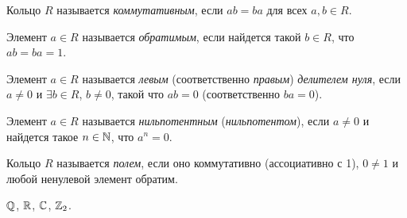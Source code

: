 \begin{definition}
    Кольцо $R$ называется \textit{коммутативным}, если $ab = ba$ для всех $a, b \in R$.
\end{definition}

\begin{definition}
    Элемент $a \in R$ называется \textit{обратимым}, если найдется такой $b \in R$, что $ab = ba = 1$.
\end{definition}

\begin{comment}
    Все обратимые элементы кольца $R$ образуют группу по умножению.
\end{comment}

\begin{definition}
    Элемент $a \in R$ называется \textit{левым} (соответственно \textit{правым}) \textit{делителем нуля}, если $a \neq 0$ и $\exists b \in R$, $b \neq 0$, такой что $ab = 0$ (соответственно $ba = 0$).
\end{definition}

\begin{comment}
    Если $R$ коммутативно, то множества левых и правых делителей нуля совпадают. Тогда левые и правые делители нуля называются просто <<делителями нуля>>.
\end{comment}

\begin{comment}
    Все делители нуля в $R$ необратимы. Если $ab = 0$, $a \neq 0$, $b \neq 0$ и существует $a^{-1}$, то получаем $a^{-1} a b = a^{-1} 0$, откуда $b = 0$ --- противоречние.
\end{comment}

\begin{definition}
    Элемент $a \in R$ называется \textit{нильпотентным} (\textit{нильпотентом}), если $a \neq 0$ и найдется такое $n \in \mathbb{N}$, что $a^{n} = 0$.
\end{definition}

\begin{comment}
    Всякий нильпотент является делителем нуля: если $a \neq 0$ и $n$ минимально, то $a \cdot a^{n - 1} = 0$.
\end{comment}

\begin{definition}
    Кольцо $R$ называется \textit{полем}, если оно коммутативно (ассоциативно с 1), $0 \neq 1$ и любой ненулевой элемент обратим.
\end{definition}

\begin{example}
    $\mathbb{Q}$, $\mathbb{R}$, $\mathbb{C}$, $\mathbb{Z}_2$.
\end{example}

